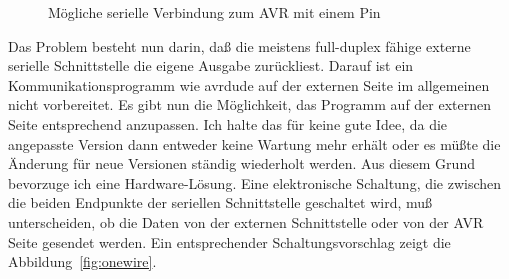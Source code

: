 \begin{figure}[H]
\centering
{}
\caption{Mögliche serielle Verbindung zum AVR mit einem Pin}
\label{fig:onewire-simple}
\end{figure}

Das Problem besteht nun darin, daß die meistens full-duplex fähige externe serielle Schnittstelle
die eigene Ausgabe zurückliest.
Darauf ist ein Kommunikationsprogramm wie avrdude auf der externen Seite im allgemeinen nicht vorbereitet.
Es gibt nun die Möglichkeit, das Programm auf der externen Seite entsprechend anzupassen.
Ich halte das für keine gute Idee, da die angepasste Version dann entweder keine Wartung
mehr erhält oder es müßte die Änderung für neue Versionen ständig wiederholt werden.
Aus diesem Grund bevorzuge ich eine Hardware-Lösung.
Eine elektronische Schaltung, die zwischen die beiden Endpunkte der seriellen Schnittstelle
geschaltet wird, muß unterscheiden, ob die Daten von der externen Schnittstelle oder
von der AVR Seite gesendet werden.
Ein entsprechender Schaltungsvorschlag zeigt die Abbildung~\ref{fig:onewire}.

